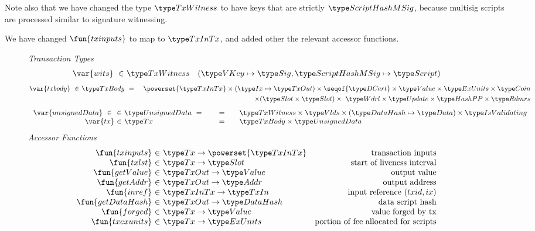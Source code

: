 Note also that we have changed the type $\TxWitness$ to have
keys that are strictly $\ScriptHashMSig$, because multisig scripts are
processed similar to signature witnessing.

We have changed $\fun{txinputs}$ to map to $\TxInTx$, and added other the relevant
accessor functions.

\begin{figure*}[htb]
  \emph{Transaction Types}
  \begin{align*}
    \var{wits} ~\in~ & \TxWitness & (\VKey \mapsto \Sig, \ScriptHashMSig \mapsto \Script)
  \end{align*}
  \begin{align*}
    \var{txbody} ~\in~
    & \TxBody ~=~
    & \powerset{\TxInTx} \times (\Ix \mapsto \TxOut) \times \seqof{\DCert}
      \times \Value \times \ExUnits \times \Coin \\
    & ~& \times (\Slot\times\Slot) \times~ \Wdrl \times \Update \times \HashPP \times \Rdmrs
  \end{align*}
  \begin{equation*}
    \begin{array}{r@{~\in~}l@{\qquad=\qquad}l}
      \var{unsignedData} ~\in~
      & \UnsignedData ~=~
      & \TxWitness \times \Vlds \times (\DataHash \mapsto \Data)
            \times \IsValidating
      \\
      \var{tx}
      & \Tx
      & \TxBody \times \UnsignedData
    \end{array}
  \end{equation*}
  \emph{Accessor Functions}
  \begin{equation*}
    \begin{array}{r@{~\in~}lr}
      \fun{txinputs} & \Tx \to \powerset{\TxInTx} & \text{transaction inputs} \\
      \fun{txlst} & \Tx \to \Slot & \text{start of liveness interval} \\
      \fun{getValue} & \TxOut \to \Value & \text{output value} \\
      \fun{getAddr} & \TxOut \to \Addr & \text{output address} \\
      \fun{inref} & \TxInTx \to \TxIn & \text{input reference $(txid,ix)$} \\
      \fun{getDataHash} & \TxOut \to \DataHash & \text{data script hash} \\
      \fun{forged} & \Tx \to \Value & \text{value forged by tx}\\
      \fun{txexunits} & \Tx \to \ExUnits & \text{portion of fee allocated for scripts}\\

\end{array}
\end{equation*}
\end{figure*}
